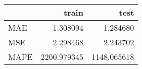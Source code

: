 \begin{tabular}{lrr}
\toprule
{} &        train &         test \\
\midrule
MAE  &     1.308094 &     1.284680 \\
MSE  &     2.298468 &     2.243702 \\
MAPE &  2200.979345 &  1148.065618 \\
\bottomrule
\end{tabular}
